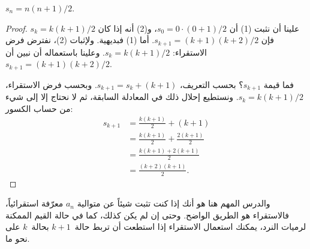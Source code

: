 \documentclass[../../../include/open-logic-section]{subfiles}
\begin{document}
\begin{prop}
  $s_n = n(n+1)/2$.
\end{prop}

\begin{proof}
  علينا أن نثبت (1) أن $s_0 = 0\cdot(0 + 1)/2$، و(2) أنه إذا كان
  $s_k = k(k+1)/2$ فإن $s_{k+1} = (k+1)(k+2)/2$. أما (1) فبديهية.
  ولإثبات (2)، نفترض فرض الاستقراء: $s_k = k(k+1)/2$. وعلينا باستعماله
  أن نبين أن $s_{k+1} = (k+1)(k+2)/2$.

  فما قيمة $s_{k+1}$؟ بحسب التعريف،
  $s_{k+1} = s_k + (k+1)$. وبحسب فرض الاستقراء،
  $s_k = k(k+1)/2$. ونستطيع إحلال ذلك في المعادلة السابقة، ثم لا نحتاج
  إلا إلى شيء من حساب الكسور:
  \begin{align*}
    s_{k+1} & = \frac{k(k+1)}{2} + (k+1)\\
    & = \frac{k(k+1)}{2} + \frac{2(k+1)}{2}\\
    & = \frac{k(k+1) + 2(k+1)}{2}\\
    & = \frac{(k+2)(k+1)}{2}.
  \end{align*}
\end{proof}

والدرس المهم هنا هو أنك إذا كنت تثبت شيئاً عن متوالية $a_n$ معرّفة
استقرائياً، فالاستقراء هو الطريق الواضح. وحتى إن لم يكن كذلك، كما في
حالة القيم الممكنة لرميات النرد، يمكنك استعمال الاستقراء إذا استطعت أن
تربط حالة~$k+1$ بحالة~$k$ على نحو ما.
\end{document}
